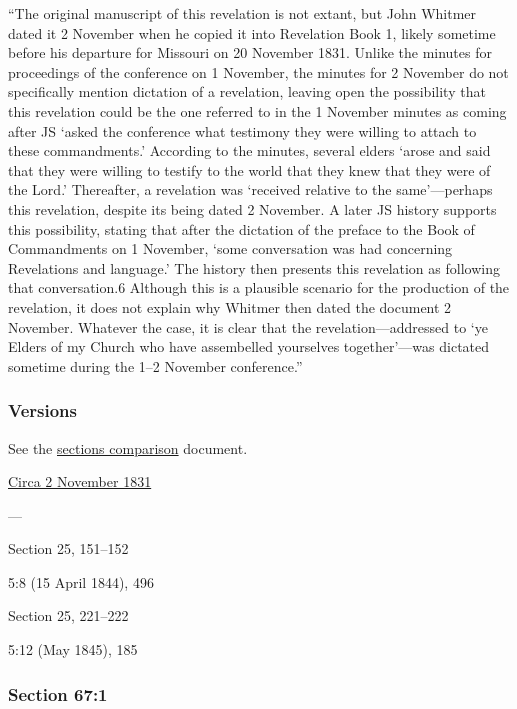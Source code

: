 			``The original manuscript of this revelation is not extant, but John Whitmer dated it 2 November when he copied it into Revelation Book 1, likely sometime before his departure for Missouri on 20 November 1831. Unlike the minutes for proceedings of the conference on 1 November, the minutes for 2 November do not specifically mention dictation of a revelation, leaving open the possibility that this revelation could be the one referred to in the 1 November minutes as coming after JS `asked the conference what testimony they were willing to attach to these commandments.' According to the minutes, several elders `arose and said that they were willing to testify to the world that they knew that they were of the Lord.' Thereafter, a revelation was `received relative to the same'---perhaps this revelation, despite its being dated 2 November. A later JS history supports this possibility, stating that after the dictation of the preface to the Book of Commandments on 1 November, `some conversation was had concerning Revelations and language.' The history then presents this revelation as following that conversation.6 Although this is a plausible scenario for the production of the revelation, it does not explain why Whitmer then dated the document 2 November. Whatever the case, it is clear that the revelation---addressed to `ye Elders of my Church who have assembelled yourselves together'---was dictated sometime during the 1--2 November conference.''
			
	\subsubsection{Versions}
		\label{DC67-V}
		
		See the \href{https://drive.google.com/file/d/1goAvNz8jS4R8slYfMG_db55Ty2z_vmgK/view?usp=sharing}{sections comparison} document.
	
		\begin{compactdesc}
			\item[JSP] \hyperref[EMS-1831-JS-CIR-2-NOV-1831]{Circa 2 November 1831}
			\item[BC] ---
			\item[DC 1835] Section 25, 151--152
			\item[TS] 5:8 (15 April 1844), 496
			\item[DC 1844] Section 25, 221--222
			\item[MS] 5:12 (May 1845), 185
		\end{compactdesc}

	\subsubsection{Section 67:1} %
		\label{DC67-1}

